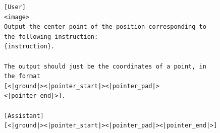 \begin{figure}[t]
\begin{tcolorbox}[colback=white, width=\linewidth, breakable, enhanced, 
                  title=Prompt for the UI-Venus-1.5 Retrofit Model, fonttitle=\bfseries]

\lstset{
basicstyle=\scriptsize\ttfamily,
    columns=fullflexible,
    breaklines=true,
    breakatwhitespace=false,
    showstringspaces=false,
    lineskip=-1pt
}

\begin{lstlisting}
[User]
<image>
Output the center point of the position corresponding to the following instruction:
{instruction}.

The output should just be the coordinates of a point, in the format
[<|ground|><|pointer_start|><|pointer_pad|><|pointer_end|>].

[Assistant]
[<|ground|><|pointer_start|><|pointer_pad|><|pointer_end|>]
\end{lstlisting}

\end{tcolorbox}
\end{figure}